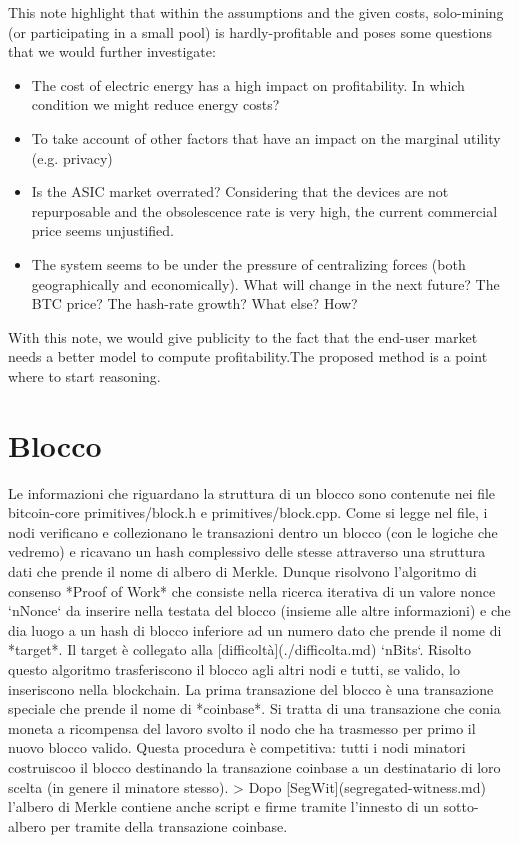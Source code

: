 \documentclass{article}
\begin{document}
This note highlight that within the assumptions and the given costs, solo-mining (or participating in a small pool) is hardly-profitable and poses some questions that we would further investigate:


\begin{itemize}
    \item The cost of electric energy has a high impact on profitability. In which condition we might reduce energy costs?
    \item To take account of other factors that have an impact on the marginal utility (e.g. privacy)
    \item Is the ASIC market overrated? Considering that the devices are not repurposable and the obsolescence rate is very high, the current commercial price seems unjustified.
    \item The system seems to be under the pressure of centralizing forces (both geographically and economically). What will change in the next future? The BTC price? The hash-rate growth? What else? How?
\end{itemize}

With this note, we would give publicity to the fact that the end-user market needs a better model to compute profitability.The proposed method is a point where to start reasoning.

\newpage

\appendix

\section{Blocco}

Le informazioni che riguardano la struttura di un blocco sono contenute nei file bitcoin-core primitives/block.h e primitives/block.cpp.
Come si legge nel file, i nodi verificano e collezionano le transazioni dentro un blocco (con le logiche che vedremo) e ricavano un hash complessivo delle stesse attraverso una struttura dati che prende il nome di albero di Merkle.
Dunque risolvono l'algoritmo di consenso *Proof of Work* che consiste nella ricerca iterativa di un valore nonce `nNonce` da inserire nella testata del blocco (insieme alle altre informazioni) e che dia luogo a un hash di blocco inferiore ad un numero dato che prende il nome di *target*. Il target è collegato alla [difficoltà](./difficolta.md) `nBits`.
Risolto questo algoritmo trasferiscono il blocco agli altri nodi e tutti, se valido, lo inseriscono nella blockchain. La prima transazione del blocco è una transazione speciale che prende il nome di *coinbase*. Si tratta di una transazione che conia moneta a ricompensa del lavoro svolto il nodo che ha trasmesso per primo il nuovo blocco valido. Questa procedura è competitiva: tutti i nodi minatori costruiscoo il blocco destinando la transazione coinbase a un destinatario di loro scelta (in genere il minatore stesso).
> Dopo [SegWit](segregated-witness.md) l'albero di Merkle contiene anche script e firme tramite l'innesto di un sotto-albero per tramite della transazione coinbase.
\end{document}
